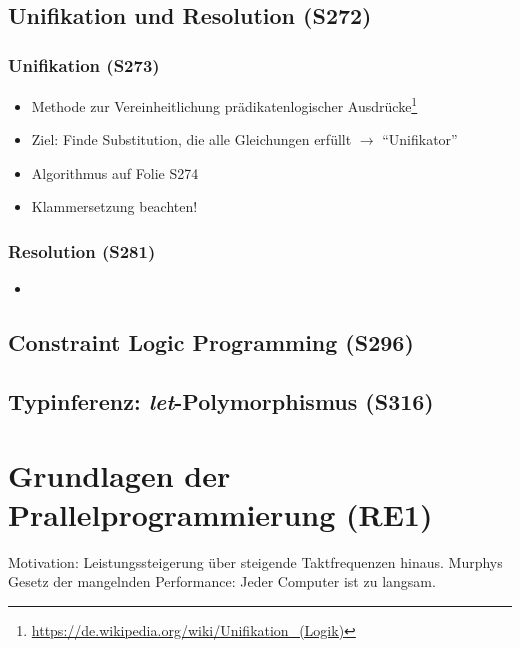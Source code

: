 \subsection{Unifikation und Resolution (S272)}

\subsubsection{Unifikation (S273)}
\begin{itemize}
	\item Methode zur Vereinheitlichung prädikatenlogischer Ausdrücke\footnote{\url{https://de.wikipedia.org/wiki/Unifikation_(Logik)}}
	\item Ziel: Finde Substitution, die alle Gleichungen erfüllt \(\rightarrow\) "`Unifikator"'
	\item Algorithmus auf Folie S274
	\item Klammersetzung beachten!
\end{itemize}

\subsubsection{Resolution (S281)}
\begin{itemize}
	\item 
\end{itemize}


\subsection{Constraint Logic Programming (S296)}


\subsection{Typinferenz: \textit{let}-Polymorphismus (S316)}



\section{Grundlagen der Prallelprogrammierung (RE1)}
Motivation: Leistungssteigerung über steigende Taktfrequenzen hinaus. Murphys Gesetz der mangelnden Performance: Jeder Computer ist zu langsam.

